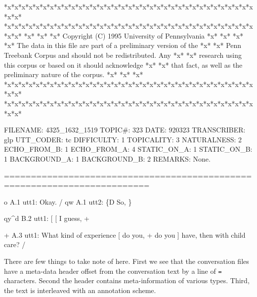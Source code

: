 \documentclass[
]{article}
\newenvironment{Shaded}{\begin{snugshade}}{\end{snugshade}}
\newcommand{\NormalTok}[1]{#1}
\begin{document}
\begin{Shaded}
\begin{Highlighting}[]
\NormalTok{*x*x*x*x*x*x*x*x*x*x*x*x*x*x*x*x*x*x*x*x*x*x*x*x*x*x*x*x*x*x*x*x*x*x*x*x*x*}
\NormalTok{*x*x*x*x*x*x*x*x*x*x*x*x*x*x*x*x*x*x*x*x*x*x*x*x*x*x*x*x*x*x*x*x*x*x*x*x*x*}
\NormalTok{*x*                                                                     *x*}
\NormalTok{*x*            Copyright (C) 1995 University of Pennsylvania            *x*}
\NormalTok{*x*                                                                     *x*}
\NormalTok{*x*    The data in this file are part of a preliminary version of the   *x*}
\NormalTok{*x*    Penn Treebank Corpus and should not be redistributed.  Any       *x*}
\NormalTok{*x*    research using this corpus or based on it should acknowledge     *x*}
\NormalTok{*x*    that fact, as well as the preliminary nature of the corpus.      *x*}
\NormalTok{*x*                                                                     *x*}
\NormalTok{*x*x*x*x*x*x*x*x*x*x*x*x*x*x*x*x*x*x*x*x*x*x*x*x*x*x*x*x*x*x*x*x*x*x*x*x*x*}
\NormalTok{*x*x*x*x*x*x*x*x*x*x*x*x*x*x*x*x*x*x*x*x*x*x*x*x*x*x*x*x*x*x*x*x*x*x*x*x*x*}


\NormalTok{FILENAME:   4325\_1632\_1519}
\NormalTok{TOPIC\#:     323}
\NormalTok{DATE:       920323}
\NormalTok{TRANSCRIBER:    glp}
\NormalTok{UTT\_CODER:  tc}
\NormalTok{DIFFICULTY: 1}
\NormalTok{TOPICALITY: 3}
\NormalTok{NATURALNESS:    2}
\NormalTok{ECHO\_FROM\_B:    1}
\NormalTok{ECHO\_FROM\_A:    4}
\NormalTok{STATIC\_ON\_A:    1}
\NormalTok{STATIC\_ON\_B:    1}
\NormalTok{BACKGROUND\_A:   1}
\NormalTok{BACKGROUND\_B:   2}
\NormalTok{REMARKS:        None.}

\NormalTok{=========================================================================}
  

\NormalTok{o          A.1 utt1: Okay.  /}
\NormalTok{qw          A.1 utt2: \{D So, \}   }

\NormalTok{qy\^{}d          B.2 utt1: [ [ I guess, +   }

\NormalTok{+          A.3 utt1: What kind of experience [ do you, + do you ] have, then with child care? /}
\end{Highlighting}
\end{Shaded}

There are few things to take note of here. First we see that the conversation files have a meta-data header offset from the conversation text by a line of \texttt{=} characters. Second the header contains meta-information of various types. Third, the text is interleaved with an annotation scheme.
\end{document}
